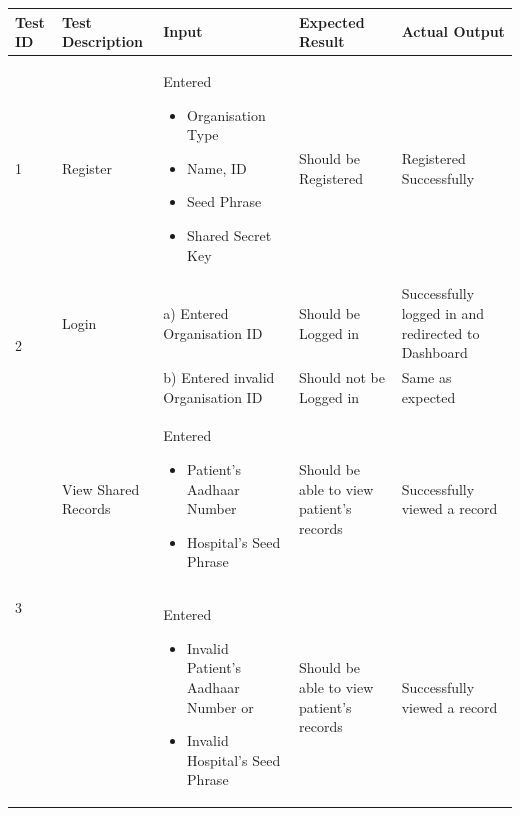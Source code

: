 \clearpage
\begin{table}[h!]
	\begin{tabular}{|p{.65cm}|p{2.5cm}|p{4cm}|p{3cm}|p{3.5cm}|} 
		\hline
		\centering\textbf{Test ID} & \centering\textbf{Test Description} & \centering\textbf{Input} & \centering\textbf{Expected Result} & \textbf{Actual Output} \\ \hline \scriptsize 1 &\scriptsize Register & \scriptsize 
		Entered 
		\begin{itemize}
		\vspace{-5mm}
		    \item Organisation Type \vspace{-5mm}
		    \item Name, ID \vspace{-5mm}
		    \item Seed Phrase \vspace{-5mm}
		    \item Shared Secret Key
		\end{itemize} & \scriptsize Should be Registered & \scriptsize Registered Successfully  \\ \hline 
		 
		\multirow{2}{1em}{\scriptsize 2} &{\scriptsize Login} & \scriptsize a) Entered Organisation ID & \scriptsize Should be Logged in & \scriptsize Successfully logged in and redirected to Dashboard \\ 
		& & \scriptsize  b) Entered invalid Organisation ID & \scriptsize Should not be Logged in & \scriptsize Same as expected \\
		\hline  
		\multirow{2}{1em}{\scriptsize 3} &{\scriptsize View Shared Records}& \scriptsize Entered	\begin{itemize}
		\vspace{-5mm}
		    \item Patient's Aadhaar Number  \vspace{-5mm}
		    \item  Hospital's Seed Phrase \vspace{-5mm}
		\end{itemize} 
	    & \scriptsize Should be able to view patient's records & \scriptsize Successfully viewed a record \\ 
	    & & \scriptsize \vspace{-5mm} Entered	\begin{itemize}
		\vspace{-5mm}
		    \item Invalid  Patient's Aadhaar Number or \vspace{-5mm}
		    \item  Invalid Hospital's Seed Phrase \vspace{-5mm}
		\end{itemize} 
	    & \scriptsize Should be able to view patient's records & \scriptsize Successfully viewed a record \\
	    \hline 
	    

\end{tabular}
\end{table}
